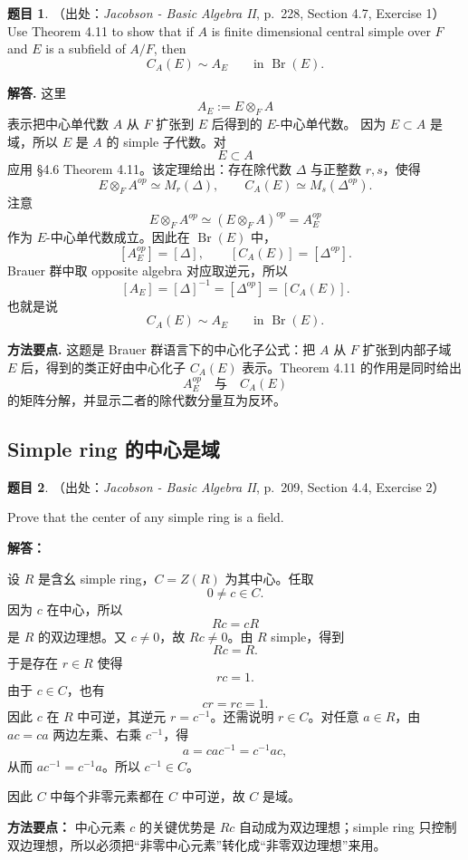 \documentclass[a4paper]{ctexart}
\theoremstyle{definition}
\newtheorem{example}{题目}[section]
\theoremstyle{analysis}
\theoremstyle{plain}
\begin{document}
\begin{example}
（出处：\textit{Jacobson - Basic Algebra II}, p.~228, Section 4.7, Exercise 1）
Use Theorem 4.11 to show that if \(A\) is finite dimensional central simple
over \(F\) and \(E\) is a subfield of \(A/F\), then
\[
  C_A(E)\sim A_E
  \qquad\text{in } \operatorname{Br}(E).
\]

\textbf{解答.}
这里
\[
  A_E:=E\otimes_F A
\]
表示把中心单代数 \(A\) 从 \(F\) 扩张到 \(E\) 后得到的 \(E\)-中心单代数。
因为 \(E\subset A\) 是域，所以 \(E\) 是 \(A\) 的 simple 子代数。对
\[
  E\subset A
\]
应用 §4.6 Theorem 4.11。该定理给出：存在除代数 \(\Delta\) 与正整数 \(r,s\)，使得
\[
  E\otimes_F A^{op}\simeq M_r(\Delta),
  \qquad
  C_A(E)\simeq M_s(\Delta^{op}).
\]
注意
\[
  E\otimes_F A^{op}\simeq (E\otimes_F A)^{op}=A_E^{op}
\]
作为 \(E\)-中心单代数成立。因此在 \(\operatorname{Br}(E)\) 中，
\[
  [A_E^{op}]=[\Delta],
  \qquad
  [C_A(E)]=[\Delta^{op}].
\]
Brauer 群中取 opposite algebra 对应取逆元，所以
\[
  [A_E]=[\Delta]^{-1}=[\Delta^{op}]=[C_A(E)].
\]
也就是说
\[
  C_A(E)\sim A_E
  \qquad\text{in } \operatorname{Br}(E).
\]

\textbf{方法要点.}
这题是 Brauer 群语言下的中心化子公式：把 \(A\) 从 \(F\) 扩张到内部子域 \(E\) 后，得到的类正好由中心化子 \(C_A(E)\) 表示。Theorem 4.11 的作用是同时给出
\[
  A_E^{op}
  \quad\text{与}\quad
  C_A(E)
\]
的矩阵分解，并显示二者的除代数分量互为反环。
\end{example}

\subsection{Simple ring 的中心是域}\label{subsec:problem-center-simple-ring-field}

\begin{example}
（出处：\textit{Jacobson - Basic Algebra II}, p.~209, Section 4.4, Exercise 2）

Prove that the center of any simple ring is a field.

\textbf{解答：}

设 \(R\) 是含幺 simple ring，\(C=Z(R)\) 为其中心。任取
\[
  0\neq c\in C.
\]
因为 \(c\) 在中心，所以
\[
  Rc=cR
\]
是 \(R\) 的双边理想。又 \(c\neq 0\)，故 \(Rc\neq 0\)。由 \(R\) simple，得到
\[
  Rc=R.
\]
于是存在 \(r\in R\) 使得
\[
  rc=1.
\]
由于 \(c\in C\)，也有
\[
  cr=rc=1.
\]
因此 \(c\) 在 \(R\) 中可逆，其逆元 \(r=c^{-1}\)。还需说明 \(r\in C\)。对任意 \(a\in R\)，由 \(ac=ca\) 两边左乘、右乘 \(c^{-1}\)，得
\[
  a=cac^{-1}=c^{-1}ac,
\]
从而 \(ac^{-1}=c^{-1}a\)。所以 \(c^{-1}\in C\)。

因此 \(C\) 中每个非零元素都在 \(C\) 中可逆，故 \(C\) 是域。

\textbf{方法要点：}
中心元素 \(c\) 的关键优势是 \(Rc\) 自动成为双边理想；simple ring 只控制双边理想，所以必须把“非零中心元素”转化成“非零双边理想”来用。
\end{example}
\end{document}
